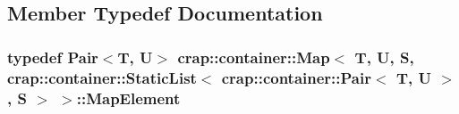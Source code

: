 \subsection{Member Typedef Documentation}
\hypertarget{classcrap_1_1container_1_1_map_a87121369de54f6650c8a84a0a19fab32}{
\subsubsection[{Map\-Element}]{\setlength{\rightskip}{0pt plus 5cm}typedef {\bf Pair}$<$T, U$>$ {\bf crap\-::container\-::\-Map}$<$ T, U, S, {\bf crap\-::container\-::\-Static\-List}$<$ {\bf crap\-::container\-::\-Pair}$<$ T, U $>$, S $>$  $>$\-::{\bf Map\-Element}\hspace{0.3cm}{\ttfamily [inherited]}}}\label{classcrap_1_1container_1_1_map_a87121369de54f6650c8a84a0a19fab32}



